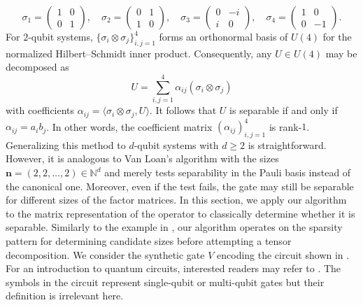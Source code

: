 \documentclass{article}
\numberwithin{equation}{section}
\theoremstyle{definition}
\begin{document}
\begin{equation*}
    \sigma_1 =
    \begin{pmatrix}
        1 & 0 \\
        0 & 1
    \end{pmatrix},
    \quad
    \sigma_2 =
    \begin{pmatrix}
        0 & 1 \\
        1 & 0
    \end{pmatrix},
    \quad
    \sigma_3 =
    \begin{pmatrix}
        0 & -i \\
        i & 0
    \end{pmatrix},
    \quad
    \sigma_4 =
    \begin{pmatrix}
        1 & 0 \\
        0 & -1
    \end{pmatrix}.
\end{equation*}
For $2$-qubit systems, $\{\sigma_i \otimes \sigma_j\}_{i,j=1}^4$ forms an orthonormal basis of $U(4)$ for the normalized Hilbert–Schmidt inner product. Consequently, any $U \in U(4)$ may be decomposed as
\begin{equation*}
    U = \sum_{i,j=1}^4 \alpha_{ij} (\sigma_i \otimes \sigma_j)
\end{equation*}
with coefficients $\alpha_{ij} = \langle \sigma_i \otimes \sigma_j, U \rangle$. It follows that $U$ is separable if and only if $\alpha_{ij}=a_i b_j$. In other words, the coefficient matrix $(\alpha_{ij})_{i,j=1}^4$ is rank-$1$. Generalizing this method to $d$-qubit systems with $d \geq 2$ is straightforward. However, it is analogous to Van Loan's algorithm with the sizes $\bm{n}=(2,2,\dots,2) \in \mathbb{N}^d$ and merely tests separability in the Pauli basis instead of the canonical one. Moreover, even if the test fails, the gate may still be separable for different sizes of the factor matrices. In this section, we apply our algorithm to the matrix representation of the operator to classically determine whether it is separable. Similarly to the example in , our algorithm operates on the sparsity pattern for determining candidate sizes before attempting a tensor decomposition. We consider the synthetic gate $V$ encoding the circuit shown in . For an introduction to quantum circuits, interested readers may refer to \cite{kaye2006introduction,nielsen2010quantum}. The symbols in the circuit represent single-qubit or multi-qubit gates but their definition is irrelevant here.
\end{document}
